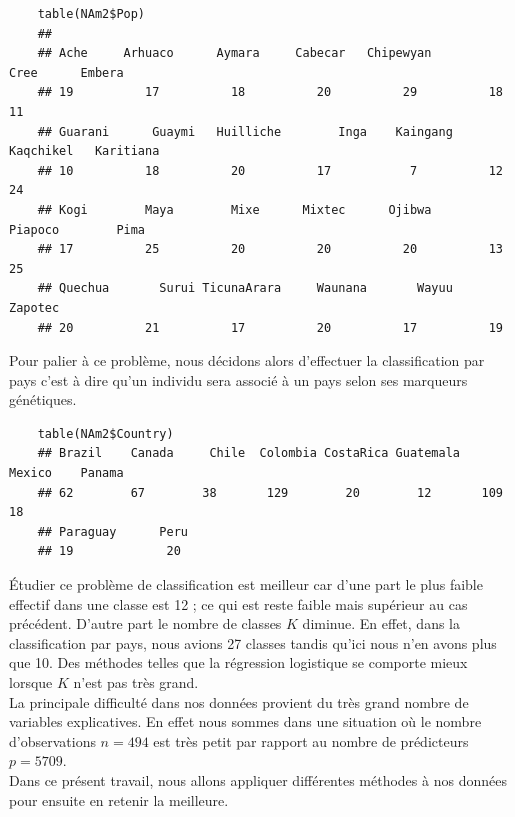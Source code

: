 \documentclass[12pt,a4paper]{article}
\begin{document}
\begin{lstlisting}
	table(NAm2$Pop)
	##
	## Ache     Arhuaco      Aymara     Cabecar   Chipewyan        Cree      Embera 
	## 19          17          18          20          29          18          11 
	## Guarani      Guaymi   Huilliche        Inga    Kaingang   Kaqchikel   Karitiana 
	## 10          18          20          17           7          12          24 
	## Kogi        Maya        Mixe      Mixtec      Ojibwa     Piapoco        Pima 
	## 17          25          20          20          20          13          25 
	## Quechua       Surui TicunaArara     Waunana       Wayuu     Zapotec 
	## 20          21          17          20          17          19 
\end{lstlisting}
Pour palier à ce problème, nous décidons alors d'effectuer la classification par pays c'est à dire qu'un individu sera associé à un pays selon ses marqueurs génétiques. 
\vspace{2mm}
\begin{lstlisting}
	table(NAm2$Country)
	## Brazil    Canada     Chile  Colombia CostaRica Guatemala    Mexico    Panama 
	## 62        67        38       129        20        12       109        18 
	## Paraguay      Peru 
	## 19             20 
\end{lstlisting}
Étudier ce problème de classification est meilleur car d'une part le plus faible effectif dans une classe est 12 ; ce qui est reste faible mais supérieur au cas précédent. D'autre part le nombre de classes $K$ diminue. En effet, dans la classification par pays, nous avions 27 classes tandis qu'ici nous n'en avons plus que 10. Des méthodes telles que la régression logistique se comporte mieux lorsque $K$ n'est pas très grand.\vspace{3mm}\\
La principale difficulté dans nos données provient du très grand nombre de variables explicatives. En effet nous sommes dans une situation où le nombre d'observations $n = 494$ est très petit par rapport au nombre de prédicteurs $p=5709$.\\
Dans ce présent travail, nous allons appliquer différentes méthodes à nos données pour ensuite en retenir la meilleure.
\end{document}
